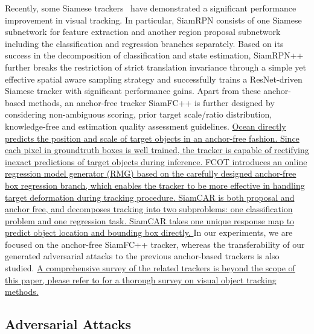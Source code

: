 \documentclass[journal]{IEEEtran}
\begin{document}
Recently, some Siamese trackers~\cite{SiamFC++,SiamRPN,SiamRPN++} have demonstrated a significant performance improvement in visual tracking. 
In particular, SiamRPN \cite{SiamRPN} consists of one Siamese subnetwork for feature extraction and another region proposal subnetwork including the classification and regression branches separately. Based on its success in the decomposition of classification and state estimation, SiamRPN++ \cite{SiamRPN++} further breaks the restriction of strict translation invariance through a simple yet effective spatial aware sampling strategy and successfully trains a ResNet-driven Siamese tracker with significant performance gains. Apart from these anchor-based methods, an anchor-free tracker SiamFC++ \cite{SiamFC++} is further designed by considering non-ambiguous scoring, prior target scale/ratio distribution, knowledge-free and estimation quality assessment guidelines.
\uline{
Ocean \cite{zhang2020ocean} directly predicts the position and scale of target objects in an anchor-free fashion. Since each pixel in groundtruth boxes is well trained, the tracker is capable of rectifying inexact predictions of target objects during inference.
FCOT \cite{cui2020fully} introduces an online regression model generator (RMG) based on the carefully designed anchor-free box regression branch, which enables the tracker to be more effective in handling target deformation during tracking procedure.
SiamCAR \cite{9157720} is both proposal and anchor free, and decomposes tracking into two subproblems: one classification problem and one regression task. SiamCAR takes one unique response map to predict object location and bounding box directly.
}
In our experiments, we are focused on the anchor-free SiamFC++ tracker, whereas the transferability of our generated adversarial attacks to the previous anchor-based trackers is also studied.
\uline{
A comprehensive survey of the related trackers is beyond the scope of this paper, please refer to \cite{9339950} for a thorough survey on visual object tracking methods.} 

\subsection{Adversarial Attacks}
\end{document}
